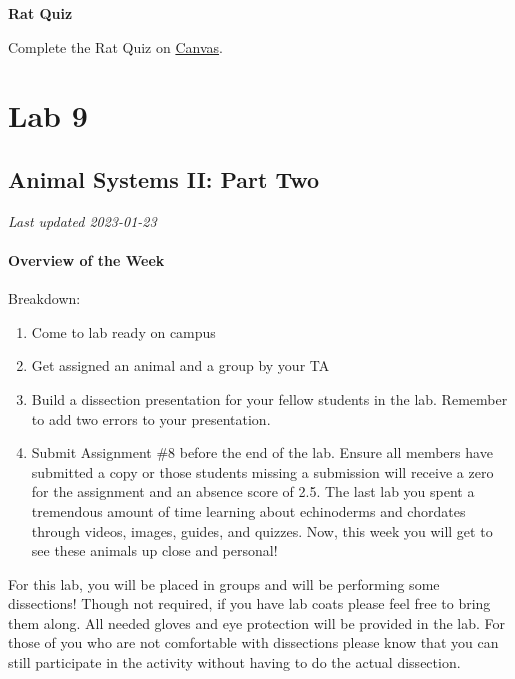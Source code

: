 \documentclass[
]{book}
\providecommand{\tightlist}{%
  \setlength{\itemsep}{0pt}\setlength{\parskip}{0pt}}
\begin{document}
\textbf{Rat Quiz}

Complete the Rat Quiz on \href{https://canvas.ubc.ca/}{Canvas}.

\hypertarget{part-lab-9}{%
\part*{Lab 9}\label{part-lab-9}}

\hypertarget{animal-systems-ii-part-two}{%
\chapter*{Animal Systems II: Part Two}\label{animal-systems-ii-part-two}}

\emph{Last updated 2023-01-23}

\hypertarget{overview-of-the-week-3}{%
\subsection*{Overview of the Week}\label{overview-of-the-week-3}}

Breakdown:

\begin{enumerate}
\def\labelenumi{\arabic{enumi}.}
\tightlist
\item
  Come to lab ready on campus
\item
  Get assigned an animal and a group by your TA
\item
  Build a dissection presentation for your fellow students in the lab. Remember to add two errors to your presentation.
\item
  Submit Assignment \#8 before the end of the lab. Ensure all members have submitted a copy or those students missing a submission will receive a zero for the assignment and an absence score of 2.5.
  The last lab you spent a tremendous amount of time learning about echinoderms and chordates through videos, images, guides, and quizzes. Now, this week you will get to see these animals up close and personal!
\end{enumerate}

For this lab, you will be placed in groups and will be performing some dissections! Though not required, if you have lab coats please feel free to bring them along. All needed gloves and eye protection will be provided in the lab. For those of you who are not comfortable with dissections please know that you can still participate in the activity without having to do the actual dissection.
\end{document}
